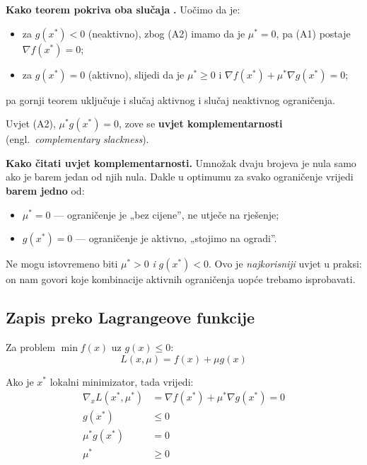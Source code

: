\textbf{Kako teorem pokriva oba slučaja} \textbf{.} Uočimo da je:

\begin{itemize}
  \item za $g(x^{*}) < 0$ (neaktivno), zbog (A2) imamo da je $\mu^{*} = 0$, pa
        (A1) postaje $\nabla f(x^{*}) = 0$;
  \item za $g(x^{*}) = 0$ (aktivno), slijedi da je $\mu^{*} \ge 0$ i
        $\nabla f(x^{*}) + \mu^{*}\nabla g(x^{*}) = 0$;
\end{itemize}

pa gornji teorem uključuje i slučaj aktivnog i slučaj neaktivnog ograničenja.

\begin{definicija}
Uvjet (A2), $\mu^{*}g(x^{*}) = 0$, zove se \textbf{uvjet komplementarnosti}
(engl.\ \emph{complementary slackness}).
\end{definicija}

\textbf{Kako čitati uvjet komplementarnosti.} Umnožak dvaju brojeva je nula samo
ako je barem jedan od njih nula. Dakle u optimumu za svako ograničenje vrijedi
\textbf{barem jedno} od:
\begin{itemize}
  \item $\mu^{*} = 0$ --- ograničenje je „bez cijene”, ne utječe na rješenje;
  \item $g(x^{*}) = 0$ --- ograničenje je aktivno, „stojimo na ogradi”.
\end{itemize}
Ne mogu istovremeno biti $\mu^{*} > 0$ \emph{i} $g(x^{*}) < 0$. Ovo je
\emph{najkorisniji} uvjet u praksi: on nam govori koje kombinacije aktivnih
ograničenja uopće trebamo isprobavati.

\subsection{Zapis preko Lagrangeove funkcije}

\begin{definicija}
Za problem $\min f(x)$ uz $g(x)\le 0$:
\[
L(x,\mu) = f(x) + \mu g(x)
\]
\end{definicija}

Ako je $x^{*}$ lokalni minimizator, tada vrijedi:
\begin{align}
\nabla_x L(x^{*},\mu^{*}) &= \nabla f(x^{*}) + \mu^{*}\nabla g(x^{*}) = 0 \\
g(x^{*}) &\le 0 \\
\mu^{*}g(x^{*}) &= 0 \\
\mu^{*} &\ge 0
\end{align}

